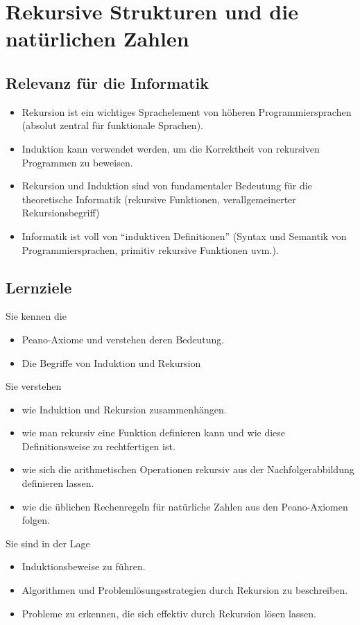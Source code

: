 \chapter{Rekursive Strukturen und die natürlichen Zahlen}




\section*{Relevanz für die Informatik}
\begin{itemize}
\item Rekursion ist ein wichtiges Sprachelement von höheren Programmiersprachen (absolut zentral für funktionale Sprachen).
\item Induktion kann verwendet werden, um die  Korrektheit von rekursiven Programmen zu beweisen.
\item Rekursion und Induktion sind von fundamentaler Bedeutung für die theoretische Informatik (rekursive Funktionen, verallgemeinerter Rekursionsbegriff)
\item Informatik ist voll von ``induktiven Definitionen'' (Syntax und Semantik von Programmiersprachen, primitiv rekursive Funktionen uvm.).
\end{itemize}



\section*{Lernziele}
Sie kennen die
\begin{itemize}
\item Peano-Axiome und verstehen deren Bedeutung.
\item Die Begriffe von Induktion und Rekursion
\end{itemize}
Sie verstehen
\begin{itemize}
\item wie Induktion und Rekursion zusammenhängen.
\item wie man rekursiv eine Funktion definieren kann und wie diese Definitionsweise zu rechtfertigen ist.
\item wie sich die arithmetischen Operationen rekursiv aus der Nachfolgerabbildung definieren lassen.
\item wie die üblichen Rechenregeln für natürliche Zahlen aus den Peano-Axiomen folgen.
\end{itemize}
Sie sind in der Lage
\begin{itemize}
\item Induktionsbeweise zu führen.
\item Algorithmen und Problemlösungsstrategien durch Rekursion zu beschreiben.
\item Probleme zu erkennen, die sich effektiv durch Rekursion lösen lassen.
\end{itemize}


